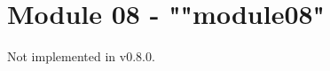 \newpage
\section{Module 08 - {\ttfamily ""module08"}}
\label{sec:module08_predicate}

Not implemented in v0.8.0.

